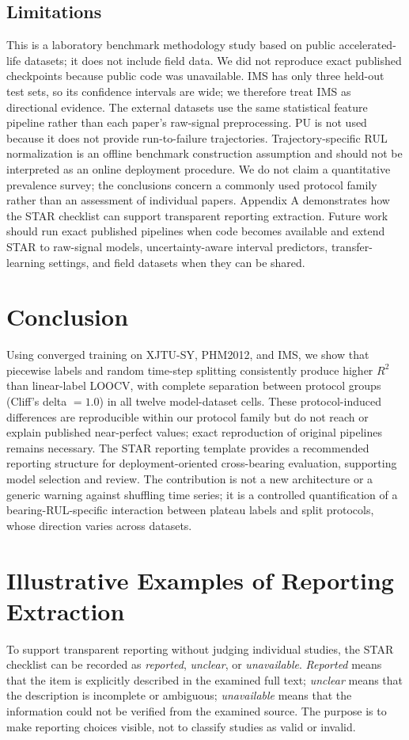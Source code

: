 \documentclass[pdflatex,sn-mathphys-num]{sn-jnl}
\begin{document}
\subsection{Limitations}
This is a laboratory benchmark methodology study based on public accelerated-life datasets; it does not include field data. We did not reproduce exact published checkpoints because public code was unavailable. IMS has only three held-out test sets, so its confidence intervals are wide; we therefore treat IMS as directional evidence. The external datasets use the same statistical feature pipeline rather than each paper's raw-signal preprocessing. PU is not used because it does not provide run-to-failure trajectories. Trajectory-specific RUL normalization is an offline benchmark construction assumption and should not be interpreted as an online deployment procedure. We do not claim a quantitative prevalence survey; the conclusions concern a commonly used protocol family rather than an assessment of individual papers. Appendix A demonstrates how the STAR checklist can support transparent reporting extraction. Future work should run exact published pipelines when code becomes available and extend STAR to raw-signal models, uncertainty-aware interval predictors, transfer-learning settings, and field datasets when they can be shared.

\section{Conclusion}
Using converged training on XJTU-SY, PHM2012, and IMS, we show that piecewise labels and random time-step splitting consistently produce higher $R^2$ than linear-label LOOCV, with complete separation between protocol groups (Cliff's delta $=1.0$) in all twelve model-dataset cells. These protocol-induced differences are reproducible within our protocol family but do not reach or explain published near-perfect values; exact reproduction of original pipelines remains necessary. The STAR reporting template provides a recommended reporting structure for deployment-oriented cross-bearing evaluation, supporting model selection and review. The contribution is not a new architecture or a generic warning against shuffling time series; it is a controlled quantification of a bearing-RUL-specific interaction between plateau labels and split protocols, whose direction varies across datasets.

\appendix
\section{Illustrative Examples of Reporting Extraction}
To support transparent reporting without judging individual studies, the STAR checklist can be recorded as \emph{reported}, \emph{unclear}, or \emph{unavailable}. \emph{Reported} means that the item is explicitly described in the examined full text; \emph{unclear} means that the description is incomplete or ambiguous; \emph{unavailable} means that the information could not be verified from the examined source. The purpose is to make reporting choices visible, not to classify studies as valid or invalid.
\end{document}

